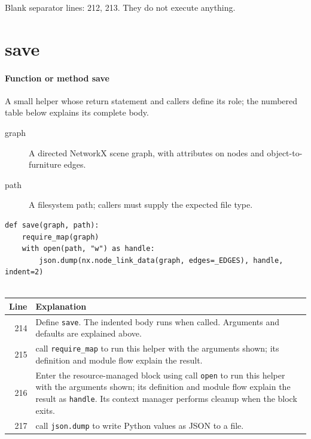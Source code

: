 \documentclass[11pt,a4paper]{book}
\begin{document}
Blank separator lines: 212, 213. They do not execute anything.

\section{save}

\paragraph{Function or method save}
A small helper whose return statement and callers define its role; the numbered table below explains its complete body.

\begin{description}
\item[graph] A directed NetworkX scene graph, with attributes on nodes and object-to-furniture edges.
\item[path] A filesystem path; callers must supply the expected file type.
\end{description}

\begin{lstlisting}[firstnumber=214]
def save(graph, path):
    require_map(graph)
    with open(path, "w") as handle:
        json.dump(nx.node_link_data(graph, edges=_EDGES), handle, indent=2)


\end{lstlisting}

\begin{longtable}{r p{}}

\textbf{Line} & \textbf{Explanation} \\ \hline \endhead

214 & Define \texttt{save}. The indented body runs when called. Arguments and defaults are explained above. \\

215 & call \texttt{require\_map} to run this helper with the arguments shown; its definition and module flow explain the result. \\

216 & Enter the resource-managed block using call \texttt{open} to run this helper with the arguments shown; its definition and module flow explain the result as \texttt{handle}. Its context manager performs cleanup when the block exits. \\

217 & call \texttt{json.dump} to write Python values as JSON to a file. \\

\end{longtable}
\end{document}
